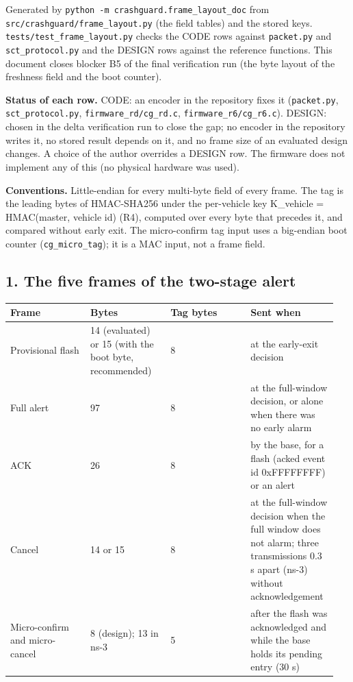 


Generated by \texttt{python -m crashguard.frame\_layout\_doc} from \texttt{src/crashguard/frame\_layout.py} (the field tables) and the stored keys. \texttt{tests/test\_frame\_layout.py} checks the CODE rows against \texttt{packet.py} and \texttt{sct\_protocol.py} and the DESIGN rows against the reference functions. This document closes blocker B5 of the final verification run (the byte layout of the freshness field and the boot counter).

\textbf{Status of each row.} CODE: an encoder in the repository fixes it (\texttt{packet.py}, \texttt{sct\_protocol.py}, \texttt{firmware\_rd/cg\_rd.c}, \texttt{firmware\_r6/cg\_r6.c}). DESIGN: chosen in the delta verification run to close the gap; no encoder in the repository writes it, no stored result depends on it, and no frame size of an evaluated design changes. A choice of the author overrides a DESIGN row. The firmware does not implement any of this (no physical hardware was used).

\textbf{Conventions.} Little-endian for every multi-byte field of every frame. The tag is the leading bytes of HMAC-SHA256 under the per-vehicle key K\_vehicle = HMAC(master, vehicle id) (R4), computed over every byte that precedes it, and compared without early exit. The micro-confirm tag input uses a big-endian boot counter (\texttt{cg\_micro\_tag}); it is a MAC input, not a frame field.

\subsection*{1. The five frames of the two-stage alert}

{\scriptsize\raggedright
\begin{longtable}{p{0.237\linewidth}p{0.237\linewidth}p{0.237\linewidth}p{0.237\linewidth}}
\toprule
Frame & Bytes & Tag bytes & Sent when \\
\midrule
\endhead
Provisional flash & 14 (evaluated) or 15 (with the boot byte, recommended) & 8 & at the early-exit decision \\
Full alert & 97 & 8 & at the full-window decision, or alone when there was no early alarm \\
ACK & 26 & 8 & by the base, for a flash (acked event id 0xFFFFFFFF) or an alert \\
Cancel & 14 or 15 & 8 & at the full-window decision when the full window does not alarm; three transmissions 0.3 s apart (ns-3) without acknowledgement \\
Micro-confirm and micro-cancel & 8 (design); 13 in ns-3 & 5 & after the flash was acknowledged and while the base holds its pending entry (30 s) \\
\bottomrule
\end{longtable}}


